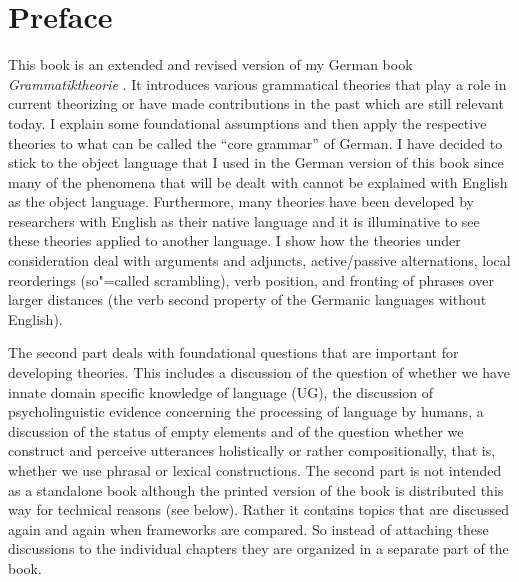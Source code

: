 \chapter{Preface}

This book is an extended and revised version of my German book \emph{Grammatiktheorie}
\citep{MuellerGTBuch2}. It introduces various grammatical theories that play a role in current
theorizing or have made contributions in the past which are still relevant today. I explain some foundational
assumptions and then apply the respective theories to what can be called the ``core grammar'' of
German. I have decided to stick to the object language that I used in the German version of this
book since many of the phenomena that will be dealt with cannot be explained with English as the object
language. Furthermore, many theories have been developed by researchers with English as their native
language and it is illuminative to see these theories applied to another language.
I show how the theories under consideration deal with arguments and adjuncts, active/passive
alternations, local reorderings (so"=called scrambling), verb position, and fronting of phrases over
larger distances (the verb second property of the Germanic languages without English).

The second part deals with foundational questions that are important for developing theories.
This includes a discussion of the question of whether we have innate domain specific knowledge of
language (UG), the discussion of psycholinguistic evidence concerning the processing of language by
humans, a discussion of the status of empty elements and of the question whether we construct and perceive utterances 
holistically or rather compositionally, that is, whether we use phrasal or lexical
constructions. The second part is not intended as a standalone book although the printed version of
the book is distributed this way for technical reasons (see below). Rather it contains topics that are discussed again and again when frameworks are
compared. So instead of attaching these discussions to the individual chapters they are organized in
a separate part of the book.

